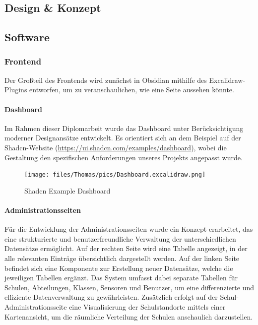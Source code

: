 \begin{inhalt}
\chapter{Design \& Konzept}
\renewcommand*\chapterpagestyle{scrheadings}
\section{Software}

\subsection{Frontend}
Der Großteil des Frontends wird zunächst in Obsidian mithilfe des Excalidraw-Plugins entworfen, um zu veranschaulichen, wie eine Seite aussehen könnte.

\subsubsection{Dashboard}

Im Rahmen dieser Diplomarbeit wurde das Dashboard unter Berücksichtigung moderner Designansätze entwickelt. Es orientiert sich an dem Beispiel auf der Shadcn-Website (\url{https://ui.shadcn.com/examples/dashboard}), wobei die Gestaltung den spezifischen Anforderungen unseres Projekts angepasst wurde.

\begin{figure}[!htb] 
\centering 
\texttt{[image: files/Thomas/pics/Dashboard.excalidraw.png]} 
\caption[Bildbezeichnung für Abbildungsverzeichnis]{Shadcn Example Dashboard} 
\label{fig:gehaeuse_internet_bild} 
\end{figure}

\subsubsection{Administrationsseiten}
\label{ref:Administrationsseiten}

Für die Entwicklung der Administrationsseiten wurde ein Konzept erarbeitet, das eine strukturierte und benutzerfreundliche Verwaltung der unterschiedlichen Datensätze ermöglicht. Auf der rechten Seite wird eine Tabelle angezeigt, in der alle relevanten Einträge übersichtlich dargestellt werden. Auf der linken Seite befindet sich eine Komponente zur Erstellung neuer Datensätze, welche die jeweiligen Tabellen ergänzt. Das System umfasst dabei separate Tabellen für Schulen, Abteilungen, Klassen, Sensoren und Benutzer, um eine differenzierte und effiziente Datenverwaltung zu gewährleisten. Zusätzlich erfolgt auf der Schul-Administrationsseite eine Visualisierung der Schulstandorte mittels einer Kartenansicht, um die räumliche Verteilung der Schulen anschaulich darzustellen.


\end{inhalt}
